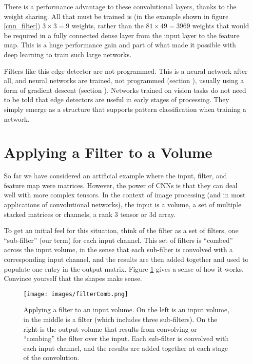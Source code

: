 There is a performance advantage to these convolutional layers, thanks to the weight sharing. All that must be trained is (in the example shown in figure \ref{cnn_filter}) $3 \times 3=9$ weights, rather than the $81 \times 49 = 3969$ weights that would be required in a fully connected dense layer from the input layer to the feature map. This is a huge performance gain and part of what  made it possible with deep learning to train such large networks.

Filters like this edge detector are not programmed. This is a neural network after all, and neural networks are trained, not programmed (section ), usually using a form of gradient descent (section ). Networks trained on vision tasks do not need to be told that edge detectors are useful in early stages of processing. They simply emerge as a structure that supports pattern classification when training a network.

\section{Applying a Filter to a Volume}

So far we have considered an artificial example where the input, filter, and feature map were matrices. However, the power of CNNs is that they can deal well with more complex tensors. In the context of image processing (and in most applications of convolutional networks), the input is a volume, a set of multiple stacked matrices or channels, a rank 3 tensor or 3d array. 

To get an initial feel for this situation, think of the filter as a set of filters, one ``sub-filter'' (our term) for each input channel. This set of filters is ``combed'' across the input volume, in the sense that each sub-filter is convolved with a corresponding input channel, and the results are then added together and used to populate one entry in the output matrix. Figure \ref{filterComb} gives a sense of how it works. Convince yourself that the shapes make sense.

\begin{figure}
\centering
\texttt{[image: images/filterComb.png]}
\caption[Soraya Boza.]{Applying a filter to an input volume. On the left is an input volume, in the middle is a filter (which includes three sub-filters). On the right is the output volume that results from convolving or ``combing'' the filter over the input. Each sub-filter is convolved with each input channel, and the results are added together at each stage of the convolution.}
\label{filterComb}
\end{figure}

